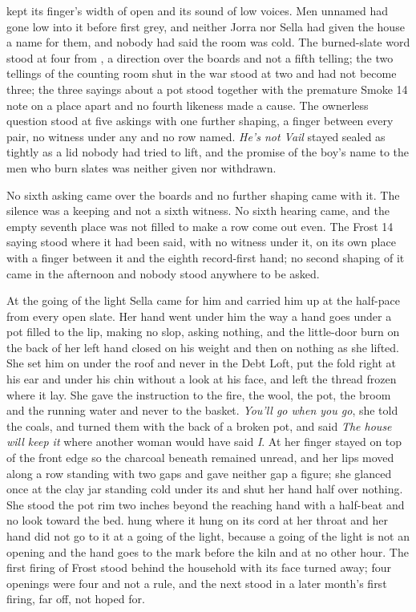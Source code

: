  kept its finger's width of open and its sound of low voices. Men unnamed had gone low into it before first grey, and neither Jorra nor Sella had given the house a name for them, and nobody had said the room was cold. The burned-slate word stood at four from , a direction over the boards and not a fifth telling; the two tellings of the counting room shut in the war stood at two and had not become three; the three sayings about a pot stood together with the premature Smoke 14 note on a place apart and no fourth likeness made a cause. The ownerless question stood at five askings with one further shaping, a finger between every pair, no witness under any and no row named. \emph{He's not Vail} stayed sealed as tightly as a lid nobody had tried to lift, and the promise of the boy's name to the men who burn slates was neither given nor withdrawn.

No sixth asking came over the boards and no further shaping came with it. The silence was a keeping and not a sixth witness. No sixth hearing came, and the empty seventh place was not filled to make a row come out even. The Frost 14 saying stood where it had been said, with no witness under it, on its own place with a finger between it and the eighth record-first hand; no second shaping of it came in the afternoon and nobody stood anywhere to be asked.

At the going of the light Sella came for him and carried him up at the half-pace from every open slate. Her hand went under him the way a hand goes under a pot filled to the lip, making no slop, asking nothing, and the little-door burn on the back of her left hand closed on his weight and then on nothing as she lifted. She set him on  under the roof and never in the Debt Loft, put the fold right at his ear and under his chin without a look at his face, and left the thread frozen where it lay. She gave the instruction to the fire, the wool, the pot, the broom and the running water and never to the basket. \emph{You'll go when you go}, she told the coals, and turned them with the back of a broken pot, and said \emph{The house will keep it} where another woman would have said \emph{I}. At  her finger stayed on top of the front edge so the charcoal beneath remained unread, and her lips moved along a row standing with two gaps and gave neither gap a figure; she glanced once at the clay jar standing cold under its  and shut her hand half over nothing. She stood the pot rim two inches beyond the reaching hand with a half-beat and no look toward the bed.  hung where it hung on its cord at her throat and her hand did not go to it at a going of the light, because a going of the light is not an opening and the hand goes to the mark before the kiln and at no other hour. The first firing of Frost stood behind the household with its face turned away; four openings were four and not a rule, and the next stood in a later month's first firing, far off, not hoped for.

